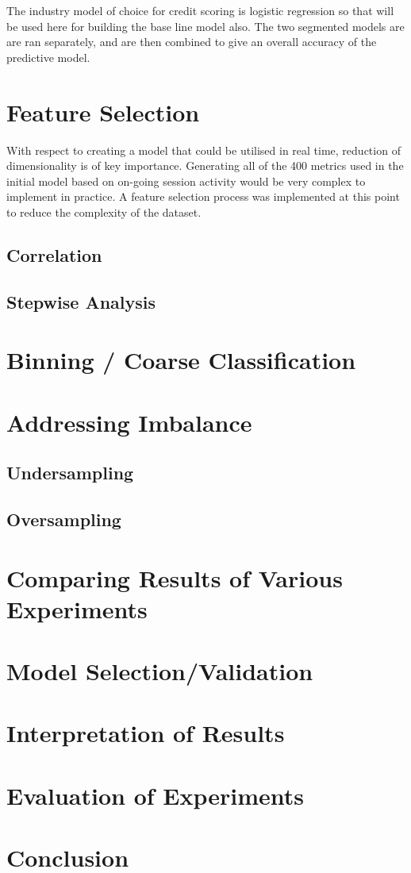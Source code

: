The industry model of choice for credit scoring is logistic regression so that will be used here for building the base line model also. The two segmented models are are ran separately, and are then combined to give an overall accuracy of the predictive model. 


\section{Feature Selection}
With respect to creating a model that could be utilised in real time, reduction of dimensionality is of key importance. Generating all of the 400 metrics used in the initial model based on on-going session activity would be very complex to implement in practice. A feature selection process was implemented at this point to reduce the complexity of the dataset. 


\subsection{Correlation}
\subsection{Stepwise Analysis}

\section{Binning / Coarse Classification}

\section{Addressing Imbalance}
\subsection{Undersampling}
\subsection{Oversampling}

\section{Comparing Results of Various Experiments}

\section{Model Selection/Validation}

\section{Interpretation of Results}

\section{Evaluation of Experiments}

\section{Conclusion}